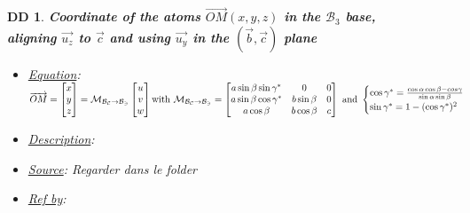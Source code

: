 \documentclass[12pt]{article}
\newtheorem{DD}{DD}
\begin{document}
\begin{DD}
\label{DD_1}
\noindent\colorbox{shadecolorDD}{\normalfont \textbf{Coordinate of the atoms $ \overrightarrow{OM}(x,y,z)$ in the $\mathcal{B}_3$ base, \\ aligning $\vec{u_z}$ to $\vec{c}$ and using $\vec{u_y}$ in the $(\vec{b}, \vec{c})$ plane}}
\normalfont
\begin{itemize}
\item \underline{Equation}:  $ \overrightarrow{OM} = 
\begin{bmatrix}
 x \\
y \\
z 
\end{bmatrix} =  \mathcal{M_{\mathcal{B}_C\rightarrow \mathcal{B}_3}} 
\begin{bmatrix}
u \\
v \\
w 
\end{bmatrix} \\ 
\text{with} \ \mathcal{M_{\mathcal{B}_C\rightarrow \mathcal{B}_3}}  = 
\begin{bmatrix}
a\sin{\beta}\sin{\gamma^{*}} & 0 & 0 \\
a\sin{\beta}\cos{\gamma^{*}} & b\sin{\beta} & 0 \\
a\cos{\beta} & b\cos{\beta} & c
\end{bmatrix} \ \text{and} \ 
\begin{cases}
\cos{\gamma^{*}} =  \frac{\cos{\alpha}\cos{\beta} - cos{\gamma}}{\sin{\alpha}\sin{\beta}} \\
\sin{\gamma^{*}} = 1 - (\cos{\gamma^{*}})^{2}
\end{cases}$
\item \underline{Description}: 
\item \underline{Source}: Regarder dans le folder
\item \underline{Ref by}: 
\end{itemize}
\end{DD}
\end{document}
